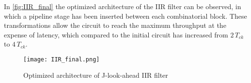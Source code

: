 In \autoref{fig:IIR_final} the optimized architecture of the IIR filter can be observed, in which a pipeline stage has been inserted between each combinatorial block. These transformations allow the circuit to reach the maximum throughput at the expense of latency, which compared to the initial circuit has increased from $2\,T_{ck}$ to $4\,T_{ck}$.

\begin{figure}[htb]
	\center
	\texttt{[image: IIR\_final.png]}
	\caption{Optimized architecture of J-look-ahead IIR filter}
	\label{fig:IIR_final}
	\end{figure}

\pagebreak